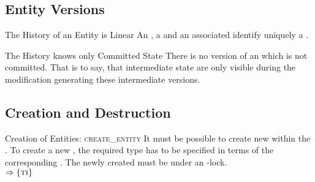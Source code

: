 \documentclass[a4paper, 12pt]{book}
\newcommand{\INTERFACE}[1]{$\Rightarrow\left\{#1\right\}$}
\begin{document}
\subsection{Entity Versions}

\begin{requirement*}{The History of an Entity is Linear}
  An , a  and an associated  identify uniquely a .
\end{requirement*}

\begin{requirement*}{The History knows only Committed State}
  There is no version of an  which is not committed. That is to
  say, that intermediate state are only visible during the modification
  generating these intermediate versions.
\end{requirement*}




\subsection{Creation and Destruction}

\newcommand{\dbaiCREATE}{{\normalfont\textsc{create\_entity}}\xspace}
\newcommand{\dbaiDESTRCUT}{{\normalfont\textsc{destruct\_entity}}\xspace}
\begin{requirement*}{Creation of Entities: \dbaiCREATE}
  It must be possible to create new  within the . To
  create a new , the required type has to be specified in terms of
  the corresponding . The newly created
   must be  under an
  \EXCLUSIVE-lock.\\
  \INTERFACE{\TRANSACTION}
\end{requirement*}
\end{document}
